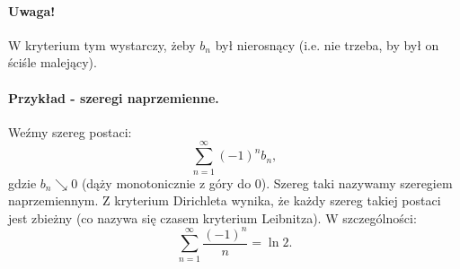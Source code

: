 \documentclass{article}
\numberwithin{defi}{section}
\numberwithin{defi}{section}
\newcommand{\oo}{\infty}
\begin{document}
\paragraph*{Uwaga!} W kryterium tym wystarczy, żeby $b_n$ był nierosnący (i.e. nie trzeba, by był on ściśle malejący).
\paragraph{Przykład - szeregi naprzemienne.} Weźmy szereg postaci:
\[\sum_{n=1}^{\oo} (-1)^n b_n,\]
gdzie $b_n \searrow 0$ (dąży monotonicznie z góry do 0). Szereg taki nazywamy szeregiem naprzemiennym. Z kryterium Dirichleta wynika, że każdy szereg takiej postaci jest zbieżny (co nazywa się czasem kryterium Leibnitza). W szczególności:
\[\sum_{n=1}^{\oo} \frac{(-1)^n}{n} = \ln 2.\]
\end{document}
